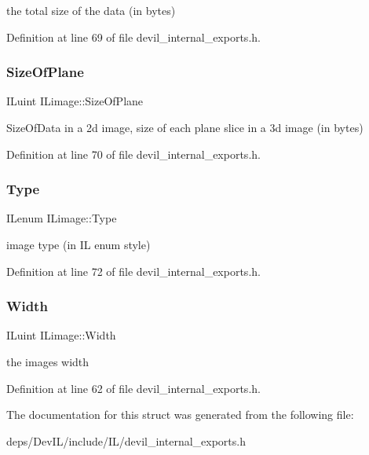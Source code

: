 the total size of the data (in bytes) 



Definition at line 69 of file devil\+\_\+internal\+\_\+exports.\+h.

\mbox{\label{structILimage_a5ce85bc0b983ddf0ed91b1ed98d9132a}} 
\subsubsection{\texorpdfstring{Size\+Of\+Plane}{SizeOfPlane}}
{\footnotesize\ttfamily I\+Luint I\+Limage\+::\+Size\+Of\+Plane}



Size\+Of\+Data in a 2d image, size of each plane slice in a 3d image (in bytes) 



Definition at line 70 of file devil\+\_\+internal\+\_\+exports.\+h.

\mbox{\label{structILimage_af84630dff97fdc18dcf1c8187f5e1918}} 
\subsubsection{\texorpdfstring{Type}{Type}}
{\footnotesize\ttfamily I\+Lenum I\+Limage\+::\+Type}



image type (in IL enum style) 



Definition at line 72 of file devil\+\_\+internal\+\_\+exports.\+h.

\mbox{\label{structILimage_acdaccde79cda12c44c7a076ef9978cf1}} 
\subsubsection{\texorpdfstring{Width}{Width}}
{\footnotesize\ttfamily I\+Luint I\+Limage\+::\+Width}



the image\textquotesingle{}s width 



Definition at line 62 of file devil\+\_\+internal\+\_\+exports.\+h.



The documentation for this struct was generated from the following file\+:\begin{DoxyCompactItemize}
\item 
deps/\+Dev\+I\+L/include/\+I\+L/devil\+\_\+internal\+\_\+exports.\+h\end{DoxyCompactItemize}
